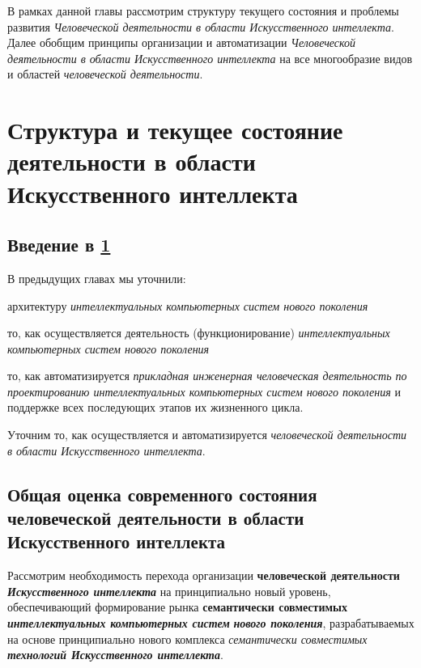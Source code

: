 В рамках данной главы рассмотрим структуру текущего состояния и проблемы развития \textit{Человеческой деятельности в области Искусственного интеллекта}. Далее обобщим принципы организации и автоматизации \textit{Человеческой деятельности в области Искусственного интеллекта} на все многообразие видов и областей \textit{человеческой деятельности}.

\section{Структура и текущее состояние деятельности в области Искусственного интеллекта}
\label{sec_activity_ai}

\subsection*{Введение в \ref{sec_activity_ai}}
В предыдущих главах мы уточнили:

\begin{textitemize}
	\item
	архитектуру \textit{интеллектуальных компьютерных систем нового поколения}
	\item
	то, как осуществляется деятельность (функционирование) \textit{интеллектуальных компьютерных систем нового поколения}
	\item
	то, как автоматизируется \textit{прикладная инженерная человеческая деятельность по проектированию интеллектуальных компьютерных систем нового поколения} и поддержке всех последующих этапов их жизненного цикла.
\end{textitemize}

Уточним то, как осуществляется и автоматизируется  \textit{человеческой деятельности в области Искусственного интеллекта}.

\subsection{Общая оценка современного состояния человеческой деятельности в области Искусственного интеллекта}
\label{subsec_general_assessment_current_state_human_activity}

Рассмотрим необходимость перехода организации \textbf{человеческой деятельности} \textbf{\textit{Искусственного интеллекта}} на принципиально новый уровень, обеспечивающий формирование рынка \textbf{семантически совместимых} \textbf{\textit{интеллектуальных компьютерных систем}} \textbf{\textit{нового поколения}}, разрабатываемых на основе принципиально нового комплекса \textit{семантически совместимых} \textbf{\textit{технологий Искусственного интеллекта}}.


